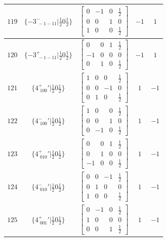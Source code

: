 \documentclass[fleqn,8pt]{jsarticle}
\begin{document}
\begin{longtable}{ccccc}
$ 119 $ & $ \{-3^{-}_{\,\,-1-11}|\frac{1}{2} 0 \frac{1}{2}\} $ & $ \begin{bmatrix} 0 & -1 & 0 & \frac{1}{2} \\ 0 & 0 & 1 & 0 \\ 1 & 0 & 0 & \frac{1}{2} \end{bmatrix} $ & $ -1 $ & $ 1 $ \\ \hline
$ 120 $ & $ \{-3^{+}_{\,\,-1-11}|\frac{1}{2} 0 \frac{1}{2}\} $ & $ \begin{bmatrix} 0 & 0 & 1 & \frac{1}{2} \\ -1 & 0 & 0 & 0 \\ 0 & 1 & 0 & \frac{1}{2} \end{bmatrix} $ & $ -1 $ & $ 1 $ \\ \hline
$ 121 $ & $ \{4^{+}_{\,\,100}{}'|\frac{1}{2} 0 \frac{1}{2}\} $ & $ \begin{bmatrix} 1 & 0 & 0 & \frac{1}{2} \\ 0 & 0 & -1 & 0 \\ 0 & 1 & 0 & \frac{1}{2} \end{bmatrix} $ & $ 1 $ & $ -1 $ \\ \hline
$ 122 $ & $ \{4^{-}_{\,\,100}{}'|\frac{1}{2} 0 \frac{1}{2}\} $ & $ \begin{bmatrix} 1 & 0 & 0 & \frac{1}{2} \\ 0 & 0 & 1 & 0 \\ 0 & -1 & 0 & \frac{1}{2} \end{bmatrix} $ & $ 1 $ & $ -1 $ \\ \hline
$ 123 $ & $ \{4^{+}_{\,\,010}{}'|\frac{1}{2} 0 \frac{1}{2}\} $ & $ \begin{bmatrix} 0 & 0 & 1 & \frac{1}{2} \\ 0 & 1 & 0 & 0 \\ -1 & 0 & 0 & \frac{1}{2} \end{bmatrix} $ & $ 1 $ & $ -1 $ \\ \hline
$ 124 $ & $ \{4^{-}_{\,\,010}{}'|\frac{1}{2} 0 \frac{1}{2}\} $ & $ \begin{bmatrix} 0 & 0 & -1 & \frac{1}{2} \\ 0 & 1 & 0 & 0 \\ 1 & 0 & 0 & \frac{1}{2} \end{bmatrix} $ & $ 1 $ & $ -1 $ \\ \hline
$ 125 $ & $ \{4^{+}_{\,\,001}{}'|\frac{1}{2} 0 \frac{1}{2}\} $ & $ \begin{bmatrix} 0 & -1 & 0 & \frac{1}{2} \\ 1 & 0 & 0 & 0 \\ 0 & 0 & 1 & \frac{1}{2} \end{bmatrix} $ & $ 1 $ & $ -1 $ \\ \hline

\end{longtable}
\end{document}
